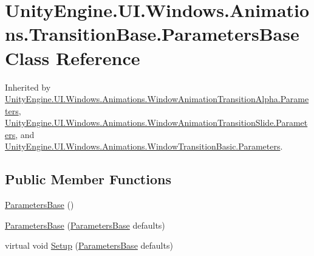 \hypertarget{class_unity_engine_1_1_u_i_1_1_windows_1_1_animations_1_1_transition_base_1_1_parameters_base}{}\section{Unity\+Engine.\+U\+I.\+Windows.\+Animations.\+Transition\+Base.\+Parameters\+Base Class Reference}
\label{class_unity_engine_1_1_u_i_1_1_windows_1_1_animations_1_1_transition_base_1_1_parameters_base}


Inherited by \hyperlink{class_unity_engine_1_1_u_i_1_1_windows_1_1_animations_1_1_window_animation_transition_alpha_1_1_parameters}{Unity\+Engine.\+U\+I.\+Windows.\+Animations.\+Window\+Animation\+Transition\+Alpha.\+Parameters}, \hyperlink{class_unity_engine_1_1_u_i_1_1_windows_1_1_animations_1_1_window_animation_transition_slide_1_1_parameters}{Unity\+Engine.\+U\+I.\+Windows.\+Animations.\+Window\+Animation\+Transition\+Slide.\+Parameters}, and \hyperlink{class_unity_engine_1_1_u_i_1_1_windows_1_1_animations_1_1_window_transition_basic_1_1_parameters}{Unity\+Engine.\+U\+I.\+Windows.\+Animations.\+Window\+Transition\+Basic.\+Parameters}.

\subsection*{Public Member Functions}
\begin{DoxyCompactItemize}
\item 
\hyperlink{class_unity_engine_1_1_u_i_1_1_windows_1_1_animations_1_1_transition_base_1_1_parameters_base_aaf4c1d944b9d728714d5b47a7f59ceb7}{Parameters\+Base} ()
\item 
\hyperlink{class_unity_engine_1_1_u_i_1_1_windows_1_1_animations_1_1_transition_base_1_1_parameters_base_a0a03eb9f23f369575b0bd202b51d2936}{Parameters\+Base} (\hyperlink{class_unity_engine_1_1_u_i_1_1_windows_1_1_animations_1_1_transition_base_1_1_parameters_base}{Parameters\+Base} defaults)
\item 
virtual void \hyperlink{class_unity_engine_1_1_u_i_1_1_windows_1_1_animations_1_1_transition_base_1_1_parameters_base_a6bf953f01f6ba32f888990fa422e1507}{Setup} (\hyperlink{class_unity_engine_1_1_u_i_1_1_windows_1_1_animations_1_1_transition_base_1_1_parameters_base}{Parameters\+Base} defaults)
\end{DoxyCompactItemize}
